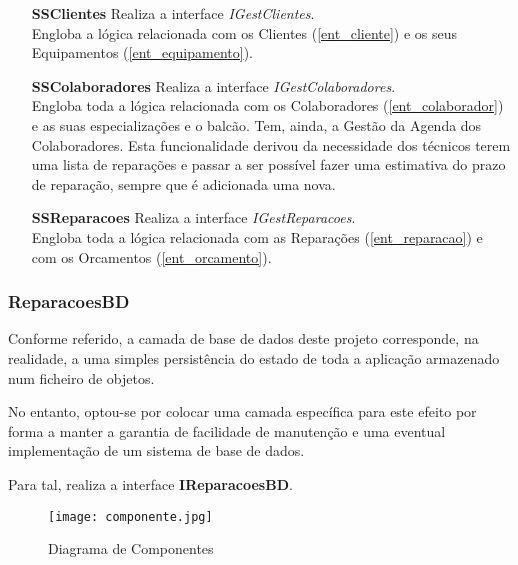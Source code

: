\documentclass[../relatorio.tex]{subfiles}
\begin{document}
\begin{itemize}
    \item[\textbf{SSClientes}] {
          Realiza a interface \textit{IGestClientes}.\\
          Engloba a lógica relacionada com os Clientes (\ref{ent_cliente})
          e os seus Equipamentos (\ref{ent_equipamento}).
          }
    \item[\textbf{SSColaboradores}] {
          Realiza a interface \textit{IGestColaboradores}.\\
          Engloba toda a lógica relacionada com os Colaboradores (\ref{ent_colaborador})
          e as suas especializações e o balcão.
          Tem, ainda, a Gestão da Agenda dos Colaboradores.
          Esta funcionalidade derivou da necessidade dos técnicos terem uma lista de reparações
          e passar a ser possível fazer uma estimativa do prazo de reparação, sempre que é adicionada
          uma nova.
          }
    \item[\textbf{SSReparacoes}] {
          Realiza a interface \textit{IGestReparacoes}.\\
          Engloba toda a lógica relacionada com as Reparações (\ref{ent_reparacao})
          e com os Orcamentos (\ref{ent_orcamento}).
          }
\end{itemize}

\subsubsection*{ReparacoesBD} \label{sec:reparacoes_bd}
Conforme referido, a camada de base de dados deste projeto corresponde,
na realidade, a uma simples persistência do estado de toda a aplicação
armazenado num ficheiro de objetos.

No entanto, optou-se por colocar uma camada específica para este efeito
por forma a manter a garantia de facilidade de manutenção e uma eventual
implementação de um sistema de base de dados.

Para tal, realiza a interface \textbf{IReparacoesBD}.

\begin{figure}[!ht]
    \texttt{[image: componente.jpg]}
    \caption{Diagrama de Componentes} \label{img:diagrama_componentes}
\end{figure}
\end{document}
